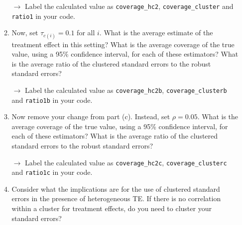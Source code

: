 \documentclass[11pt, a4paper]{article}
\begin{document}
\begin{enumerate}
\begin{enumerate}
  \hspace{10pt} $\rightarrow$ Label the calculated value as \texttt{coverage\_hc2}, \texttt{coverage\_cluster}  and \texttt{ratio1} in your code.
  \item Now, set $\tau_{c(i)} = 0.1$ for all $i$. What is the average estimate of the treatment effect in this setting? What is the average coverage of the true value, using a 95\% confidence interval, for each of these estimators? What is the average ratio of the clustered standard errors to the robust standard errors?
  
  \hspace{10pt} $\rightarrow$ Label the calculated value as \texttt{coverage\_hc2b}, \texttt{coverage\_clusterb}  and \texttt{ratio1b} in your code.
  \item Now remove your change from part (c). Instead, set $\rho = 0.05$. What is the average coverage of the true value, using a 95\% confidence interval, for each of these estimators? What is the average ratio of the clustered standard errors to the robust standard errors?

  \hspace{10pt} $\rightarrow$ Label the calculated value as \texttt{coverage\_hc2c}, \texttt{coverage\_clusterc}  and \texttt{ratio1c} in your code.
  \item Consider what the implications are for the use of clustered standard errors in the presence of heterogeneous TE. If there is no correlation within a cluster for treatment effects, do you need to cluster your standard errors? 
\end{enumerate}
\end{enumerate}
\end{document}
